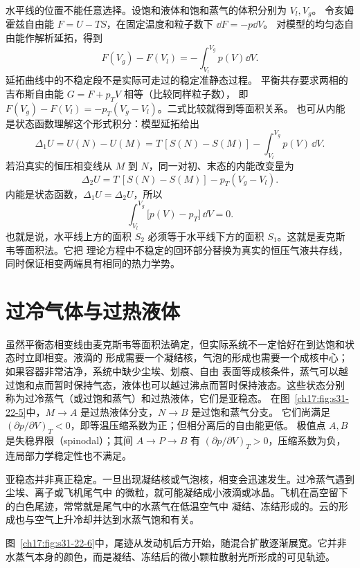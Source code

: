 {水平线的位置不能任意选择。设饱和液体和饱和蒸气的体积分别为 $V_l,V_g$。
令亥姆霍兹自由能 $F=U-TS$，在固定温度和粒子数下 $\dd F=-p\dd V$。
对模型的均匀态自由能作解析延拓，得到
\[F(V_g)-F(V_l)=-\int_{V_l}^{V_g}p(V)\dd V.\]
延拓曲线中的不稳定段不是实际可走过的稳定准静态过程。
平衡共存要求两相的吉布斯自由能 $G=F+p_TV$ 相等（比较同样粒子数），
即 $F(V_g)-F(V_l)=-p_T(V_g-V_l)$。二式比较就得到等面积关系。
也可从内能是状态函数理解这个形式积分：模型延拓给出
\[
  \Delta_1U=U(N)-U(M)
  =T\,[S(N)-S(M)]-\int_{V_l}^{V_g}p(V)\,\dd V.
\]
若沿真实的恒压相变线从 $M$ 到 $N$，同一对初、末态的内能改变量为
\[
  \Delta_2U=T\,[S(N)-S(M)]-p_T(V_g-V_l).
\]
内能是状态函数，$\Delta_1U=\Delta_2U$，所以
\begin{equation}
  \boxed{\int_{V_l}^{V_g}\bigl[p(V)-p_T\bigr]\,\dd V=0}.
  \label{ch17:eq:s31-22-6}
\end{equation}
也就是说，水平线上方的面积 $S_2$ 必须等于水平线下方的面积 $S_1$。这就是麦克斯韦等面积法。它把
理论方程中不稳定的回环部分替换为真实的恒压气液共存线，同时保证相变两端具有相同的热力学势。

\section{过冷气体与过热液体}

虽然平衡态相变线由麦克斯韦等面积法确定，但实际系统不一定恰好在到达饱和状态时立即相变。液滴的
形成需要一个凝结核，气泡的形成也需要一个成核中心；如果容器非常洁净，系统中缺少尘埃、划痕、自由
表面等成核条件，蒸气可以越过饱和点而暂时保持气态，液体也可以越过沸点而暂时保持液态。这些状态分别
称为过冷蒸气（或过饱和蒸气）和过热液体，它们是亚稳态。
在图~\ref{ch17:fig:s31-22-5}中，$M\to A$ 是过热液体分支，$N\to B$ 是过饱和蒸气分支。
它们尚满足 $(\partial p/\partial V)_T<0$，即等温压缩系数为正；但相分离后的自由能更低。
极值点 $A,B$ 是失稳界限（spinodal）；其间 $A\to P\to B$ 有
$(\partial p/\partial V)_T>0$，压缩系数为负，连局部力学稳定性也不满足。

亚稳态并非真正稳定。一旦出现凝结核或气泡核，相变会迅速发生。过冷蒸气遇到尘埃、离子或飞机尾气中
的微粒，就可能凝结成小液滴或冰晶。飞机在高空留下的白色尾迹，常常就是尾气中的水蒸气在低温空气中
凝结、冻结形成的。云的形成也与空气上升冷却并达到水蒸气饱和有关。

图~\ref{ch17:fig:s31-22-6}中，尾迹从发动机后方开始，随混合扩散逐渐展宽。它并非水蒸气本身的颜色，而是凝结、冻结后的微小颗粒散射光所形成的可见轨迹。
\par\noindent\begin{minipage}{\linewidth}
\contrailFigure
{}\label{ch17:fig:s31-22-6}
\end{minipage}\par\medskip

}

